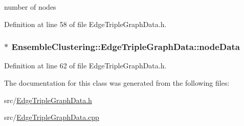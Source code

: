 number of nodes 



Definition at line 58 of file Edge\-Triple\-Graph\-Data.\-h.

\hypertarget{class_ensemble_clustering_1_1_edge_triple_graph_data_ac9d42d7b576078953b3ddbae01004dd8}{
\subsubsection[{node\-Data}]{$\ast$ Ensemble\-Clustering\-::\-Edge\-Triple\-Graph\-Data\-::node\-Data}}\label{class_ensemble_clustering_1_1_edge_triple_graph_data_ac9d42d7b576078953b3ddbae01004dd8}


Definition at line 62 of file Edge\-Triple\-Graph\-Data.\-h.



The documentation for this class was generated from the following files\-:\begin{DoxyCompactItemize}
\item 
src/\hyperlink{_edge_triple_graph_data_8h}{Edge\-Triple\-Graph\-Data.\-h}\item 
src/\hyperlink{_edge_triple_graph_data_8cpp}{Edge\-Triple\-Graph\-Data.\-cpp}\end{DoxyCompactItemize}
